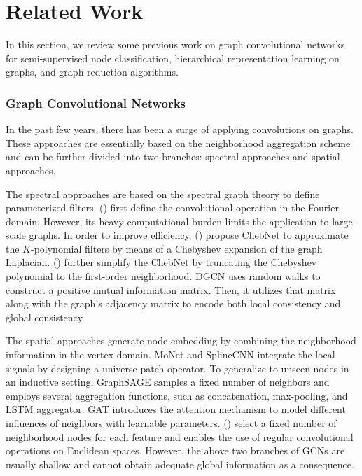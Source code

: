 \documentclass{article}
\begin{document}
 \section{Related Work}

In this section, we review some previous work on graph convolutional networks for semi-supervised node classification, hierarchical representation learning on graphs, and graph reduction algorithms.

\subsubsection{Graph Convolutional Networks}
In the past few years, there has been a surge of applying convolutions on graphs. These approaches are essentially based on the neighborhood aggregation scheme and can be further divided into two branches: spectral approaches and spatial approaches.

The spectral approaches are based on the spectral graph theory to define parameterized filters. \citeauthor{Bruna:2014vg} (\citeyear{Bruna:2014vg}) first define the convolutional operation in the Fourier domain. However, its heavy computational burden limits the application to large-scale graphs. In order to improve efficiency, \citeauthor{NIPS2016_6081} (\citeyear{NIPS2016_6081}) propose ChebNet to approximate the $K$-polynomial filters by means of a Chebyshev expansion of the graph Laplacian. \citeauthor{Kipf:2016tc} (\citeyear{Kipf:2016tc}) further simplify the ChebNet by truncating the Chebyshev polynomial to the first-order neighborhood. DGCN \cite{Zhuang:2018:DGC:3178876.3186116} uses random walks to construct a positive mutual information matrix. Then, it utilizes that matrix along with the graph's adjacency matrix to encode both local consistency and global consistency.

The spatial approaches generate node embedding by combining the neighborhood information in the vertex domain. MoNet \cite{8100059} and SplineCNN \cite{Fey/etal/2018} integrate the local signals by designing a universe patch operator. To generalize to unseen nodes in an inductive setting, GraphSAGE \cite{DBLP:conf/nips/HamiltonYL17} samples a fixed number of neighbors and employs several aggregation functions, such as concatenation, max-pooling, and LSTM aggregator. GAT \cite{Velickovic:2018we} introduces the attention mechanism to model different influences of neighbors with learnable parameters. \citeauthor{Gao:2018:LLG:3219819.3219947} (\citeyear{Gao:2018:LLG:3219819.3219947}) select a fixed number of neighborhood nodes for each feature and enables the use of regular convolutional operations on Euclidean spaces. However, the above two branches of GCNs are usually shallow and cannot obtain adequate global information as a consequence.
\end{document}

